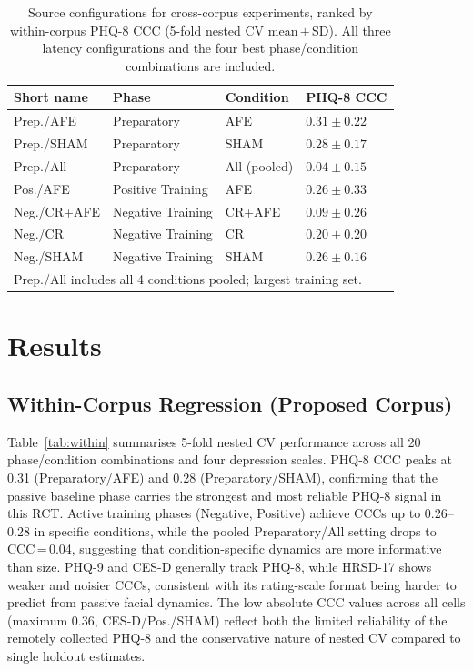 \documentclass[sigconf]{acmart}
\begin{document}
\begin{table}[t]
\small
\caption{Source configurations for cross-corpus experiments, ranked by within-corpus
PHQ-8 CCC (5-fold nested CV mean\,$\pm$\,SD). All three latency configurations and
the four best phase/condition combinations are included.}
\label{tab:configs}
\renewcommand{\arraystretch}{1.05}
\begin{tabular}{llll}
\toprule
Short name & Phase & Condition & PHQ-8 CCC \\
\midrule
Prep./AFE      & Preparatory       & AFE          & $0.31 \pm 0.22$ \\
Prep./SHAM     & Preparatory       & SHAM         & $0.28 \pm 0.17$ \\
Prep./All      & Preparatory       & All (pooled) & $0.04 \pm 0.15$ \\
Pos./AFE      & Positive Training & AFE          & $0.26 \pm 0.33$ \\
Neg./CR+AFE   & Negative Training & CR+AFE       & $0.09 \pm 0.26$ \\
Neg./CR       & Negative Training & CR           & $0.20 \pm 0.20$ \\
Neg./SHAM     & Negative Training & SHAM         & $0.26 \pm 0.16$ \\
\bottomrule
\multicolumn{4}{l}{\footnotesize Prep./All includes all 4 conditions pooled; largest training set.}
\end{tabular}
\end{table}


\section{Results}
\label{sec:results}

\subsection{Within-Corpus Regression (Proposed Corpus)}
\label{sec:results_within}

Table~\ref{tab:within} summarises 5-fold nested CV performance across all 20
phase/condition combinations and four depression scales. PHQ-8 CCC peaks at 0.31
(Preparatory/AFE) and 0.28 (Preparatory/SHAM), confirming that the passive baseline
phase carries the strongest and most reliable PHQ-8 signal in this RCT. Active
training phases (Negative, Positive) achieve CCCs up to 0.26--0.28 in specific
conditions, while the pooled Preparatory/All setting drops to CCC\,=\,0.04, suggesting
that condition-specific dynamics are more informative than size.
PHQ-9 and CES-D generally track PHQ-8, while HRSD-17 shows weaker and noisier CCCs,
consistent with its rating-scale format being harder to predict from passive facial dynamics.
The low absolute CCC values across all cells (maximum 0.36, CES-D/Pos./SHAM) reflect
both the limited reliability of the remotely collected PHQ-8 and the conservative
nature of nested CV compared to single holdout estimates.
\end{document}
